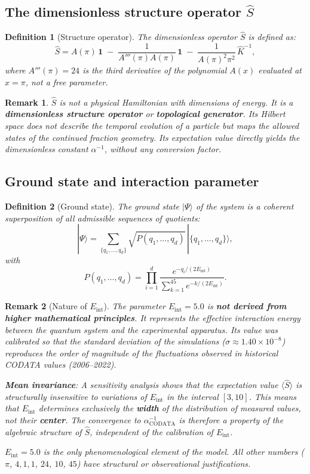 \documentclass[12pt]{article}
\newtheorem{definition}{Definition}
\newtheorem{remark}{Remark}
\begin{document}
\subsection{The dimensionless structure operator $\hat S$}

\begin{definition}[Structure operator]
The dimensionless operator $\hat S$ is defined as:
\[
\hat S = A(\pi)\,\mathbf{1} \;-\; \frac{1}{A'''(\pi)A(\pi)}\,\mathbf{1} \;-\; \frac{1}{A(\pi)^2 \pi^2}\,\hat K^{-1},
\]
where $A'''(\pi)=24$ is the third derivative of the polynomial $A(x)$ evaluated at $x=\pi$, not a free parameter.
\end{definition}

\begin{remark}
$\hat S$ is not a physical Hamiltonian with dimensions of energy. It is a \textbf{dimensionless structure operator} or \textbf{topological generator}. Its Hilbert space does not describe the temporal evolution of a particle but maps the allowed states of the continued fraction geometry. Its expectation value directly yields the dimensionless constant $\alpha^{-1}$, without any conversion factor.
\end{remark}

\subsection{Ground state and interaction parameter}

\begin{definition}[Ground state]
The ground state $|\Psi\rangle$ of the system is a coherent superposition of all admissible sequences of quotients:
\[
|\Psi\rangle = \sum_{\{q_1,\dots,q_d\}} \sqrt{P(q_1,\dots,q_d)}\, |\{q_1,\dots,q_d\}\rangle,
\]
with
\[
P(q_1,\dots,q_d) = \prod_{i=1}^d \frac{e^{-q_i/(2E_{\text{int}})}}{\sum_{k=1}^{45} e^{-k/(2E_{\text{int}})}}.
\]
\end{definition}

\begin{remark}[Nature of $E_{\text{int}}$]
The parameter $E_{\text{int}} = 5.0$ is \textbf{not derived from higher mathematical principles}. It represents the effective interaction energy between the quantum system and the experimental apparatus. Its value was calibrated so that the standard deviation of the simulations ($\sigma \approx 1.40\times10^{-8}$) reproduces the order of magnitude of the fluctuations observed in historical CODATA values (2006–2022).

\textbf{Mean invariance}: A sensitivity analysis shows that the expectation value $\langle \hat S \rangle$ is structurally insensitive to variations of $E_{\text{int}}$ in the interval $[3,10]$. This means that $E_{\text{int}}$ determines exclusively the \textbf{width} of the distribution of measured values, not their \textbf{center}. The convergence to $\alpha^{-1}_{\text{CODATA}}$ is therefore a property of the algebraic structure of $\hat S$, independent of the calibration of $E_{\text{int}}$.

$E_{\text{int}} = 5.0$ is the only phenomenological element of the model. All other numbers ($\pi$, $4,1,1$, $24$, $10$, $45$) have structural or observational justifications.
\end{remark}
\end{document}

